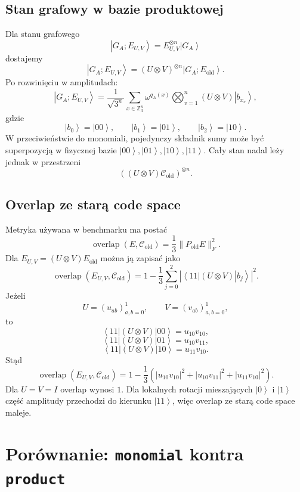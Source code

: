 \documentclass[11pt,a4paper]{article}
\newcommand{\Z}{\mathbb{Z}}
\newcommand{\Eold}{E_{\mathrm{old}}}
\newcommand{\Cold}{\mathcal{C}_{\mathrm{old}}}
\newcommand{\w}{\omega}
\newcommand{\ket}[1]{\left|#1\right\rangle}
\newcommand{\bra}[1]{\left\langle#1\right|}
\begin{document}
\subsection{Stan grafowy w bazie produktowej}

Dla stanu grafowego
\[
    \ket{G_A;E_{U,V}}
    =
    E_{U,V}^{\otimes n}\ket{G_A}
\]
dostajemy
\[
    \boxed{
    \ket{G_A;E_{U,V}}
    =
    (U\otimes V)^{\otimes n}
    \ket{G_A;\Eold}
    }.
\]
Po rozwinięciu w amplitudach:
\[
    \ket{G_A;E_{U,V}}
    =
    \frac{1}{\sqrt{3^n}}
    \sum_{x\in\Z_3^n}
    \w^{q_A(x)}
    \bigotimes_{v=1}^{n}
    (U\otimes V)\ket{b_{x_v}},
\]
gdzie
\[
    \ket{b_0}=\ket{00},\qquad
    \ket{b_1}=\ket{01},\qquad
    \ket{b_2}=\ket{10}.
\]
W przeciwieństwie do monomiali, pojedynczy składnik sumy może być superpozycją
w fizycznej bazie \(\ket{00},\ket{01},\ket{10},\ket{11}\). Cały stan nadal
leży jednak w przestrzeni
\[
    \left((U\otimes V)\Cold\right)^{\otimes n}.
\]

\subsection{Overlap ze starą code space}

Metryka używana w benchmarku ma postać
\[
    \operatorname{overlap}(E,\Cold)
    =
    \frac{1}{3}\|P_{\mathrm{old}}E\|_F^2.
\]
Dla \(E_{U,V}=(U\otimes V)\Eold\) można ją zapisać jako
\[
    \operatorname{overlap}(E_{U,V},\Cold)
    =
    1-\frac{1}{3}
    \sum_{j=0}^{2}
    \left|
    \bra{11}(U\otimes V)\ket{b_j}
    \right|^2.
\]
Jeżeli
\[
    U=(u_{ab})_{a,b=0}^{1},
    \qquad
    V=(v_{ab})_{a,b=0}^{1},
\]
to
\[
    \bra{11}(U\otimes V)\ket{00}=u_{10}v_{10},
\]
\[
    \bra{11}(U\otimes V)\ket{01}=u_{10}v_{11},
\]
\[
    \bra{11}(U\otimes V)\ket{10}=u_{11}v_{10}.
\]
Stąd
\[
    \operatorname{overlap}(E_{U,V},\Cold)
    =
    1-\frac{1}{3}
    \left(
        |u_{10}v_{10}|^2
        +
        |u_{10}v_{11}|^2
        +
        |u_{11}v_{10}|^2
    \right).
\]
Dla \(U=V=I\) overlap wynosi \(1\). Dla lokalnych rotacji mieszających
\(\ket{0}\) i \(\ket{1}\) część amplitudy przechodzi do kierunku \(\ket{11}\),
więc overlap ze starą code space maleje.

\section{Porównanie: \texttt{monomial} kontra \texttt{product}}
\end{document}
